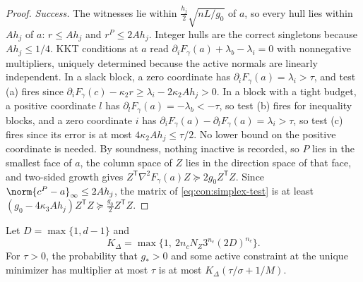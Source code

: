\begin{proof}
\emph{Success.} The witnesses lie within $\frac{h_j}2\sqrt{nL/g_0}$ of $a$, so
every hull lies within $Ah_j$ of $a$: $r\le Ah_j$ and $r^P\le2Ah_j$. Integer
hulls are the correct singletons because $Ah_j\le1/4$. KKT conditions at $a$
read $\partial_iF_\gamma(a)+\lambda_b-\lambda_i=0$ with nonnegative
multipliers, uniquely determined because the active normals are linearly
independent. In a slack block, a zero coordinate has
$\partial_iF_\gamma(a)=\lambda_i>\tau$, and test (a) fires since
$\partial_iF_\gamma(c)-\kappa_2r\ge\lambda_i-2\kappa_2Ah_j>0$. In a block with a
tight budget, a positive coordinate $l$ has $\partial_lF_\gamma(a)=-\lambda_b<-\tau$,
so test (b) fires for inequality blocks, and a zero coordinate $i$ has
$\partial_iF_\gamma(a)-\partial_lF_\gamma(a)=\lambda_i>\tau$, so test (c) fires
since its error is at most $4\kappa_2Ah_j\le\tau/2$. No lower bound on the
positive coordinate is needed. By soundness, nothing inactive is recorded, so
$P$ lies in the smallest face of $a$, the column space of $Z$ lies in the
direction space of that face, and two-sided growth gives
$Z^{\mathsf T}\nabla^2F_\gamma(a)Z\succeq2g_0Z^{\mathsf T}Z$. Since
$\norm{c^P-a}_\infty\le2Ah_j$, the matrix of \eqref{eq:con:simplex-test} is at
least $(g_0-4\kappa_3Ah_j)Z^{\mathsf T}Z\succeq\frac{g_0}2Z^{\mathsf T}Z$.
\end{proof}

\begin{lemma}\label{lem:con:simplex-tail}
Let $D=\max\{1,d-1\}$ and
\[
 K_\Delta=\max\{1,\ 2n_cN_Z3^{n_c}(2D)^{n_c}\}.
\]
For $\tau>0$, the probability that $g_*>0$ and some active constraint at the
unique minimizer has multiplier at most $\tau$ is at most
$K_\Delta(\tau/\sigma+1/M)$.
\end{lemma}

